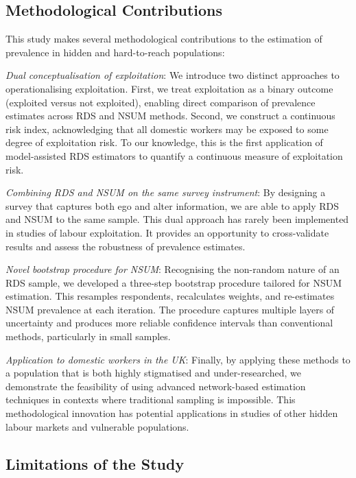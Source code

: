 \documentclass[
  12pt,
  letterpaper,
  DIV=11,
  numbers=noendperiod]{scrartcl}
\theoremstyle{plain}
\theoremstyle{definition}
\begin{document}
\subsection{Methodological
Contributions}\label{methodological-contributions}

This study makes several methodological contributions to the estimation
of prevalence in hidden and hard-to-reach populations:

\emph{Dual conceptualisation of exploitation}: We introduce two distinct
approaches to operationalising exploitation. First, we treat
exploitation as a binary outcome (exploited versus not exploited),
enabling direct comparison of prevalence estimates across RDS and NSUM
methods. Second, we construct a continuous risk index, acknowledging
that all domestic workers may be exposed to some degree of exploitation
risk. To our knowledge, this is the first application of model-assisted
RDS estimators to quantify a continuous measure of exploitation risk.

\emph{Combining RDS and NSUM on the same survey instrument}: By
designing a survey that captures both ego and alter information, we are
able to apply RDS and NSUM to the same sample. This dual approach has
rarely been implemented in studies of labour exploitation. It provides
an opportunity to cross-validate results and assess the robustness of
prevalence estimates.

\emph{Novel bootstrap procedure for NSUM}: Recognising the non-random
nature of an RDS sample, we developed a three-step bootstrap procedure
tailored for NSUM estimation. This resamples respondents, recalculates
weights, and re-estimates NSUM prevalence at each iteration. The
procedure captures multiple layers of uncertainty and produces more
reliable confidence intervals than conventional methods, particularly in
small samples.

\emph{Application to domestic workers in the UK}: Finally, by applying
these methods to a population that is both highly stigmatised and
under-researched, we demonstrate the feasibility of using advanced
network-based estimation techniques in contexts where traditional
sampling is impossible. This methodological innovation has potential
applications in studies of other hidden labour markets and vulnerable
populations.

\subsection{Limitations of the Study}\label{limitations-of-the-study}
\end{document}
